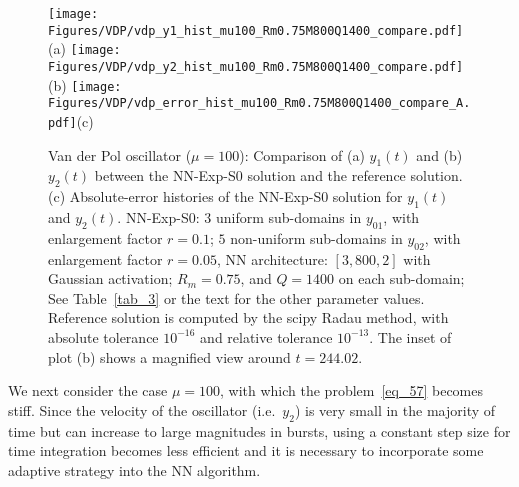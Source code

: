 \begin{figure}
  \centerline{
    \texttt{[image: Figures/VDP/vdp\_y1\_hist\_mu100\_Rm0.75M800Q1400\_compare.pdf]}(a)
    \texttt{[image: Figures/VDP/vdp\_y2\_hist\_mu100\_Rm0.75M800Q1400\_compare.pdf]}(b)
    \texttt{[image: Figures/VDP/vdp\_error\_hist\_mu100\_Rm0.75M800Q1400\_compare\_A.pdf]}(c)
  }
  \caption{Van der Pol oscillator ($\mu=100$):
    Comparison of (a) $y_1(t)$ and (b) $y_2(t)$ between
    the NN-Exp-S0 solution and the reference solution.
    (c) Absolute-error histories of the NN-Exp-S0 solution
    for $y_1(t)$ and $y_2(t)$.
    NN-Exp-S0: 
    $3$ uniform sub-domains in $y_{01}$, with enlargement factor $r=0.1$;
    $5$ non-uniform
    sub-domains in $y_{02}$, with enlargement factor $r=0.05$,
    NN architecture: $[3, 800, 2]$
    with Gaussian activation;
    $R_m=0.75$, and $Q=1400$ on each sub-domain;
    See Table~\ref{tab_3} or the text for the other parameter values.
    Reference solution is computed by the scipy Radau method, with absolute tolerance
    $10^{-16}$ and relative tolerance $10^{-13}$.
    The inset of plot (b) shows a magnified view around $t=244.02$.
  }
  \label{fg_19}
\end{figure}

We next consider the case $\mu=100$, with which the problem~\eqref{eq_57} becomes stiff.
Since the velocity of the oscillator (i.e.~$y_2$) is very small in the
majority of time
but can increase to large magnitudes in bursts, using a constant step size
for time integration becomes less efficient and it is necessary to incorporate
some adaptive strategy into the NN algorithm.

